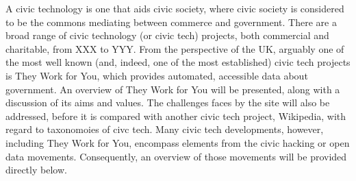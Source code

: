 A civic technology is one that aids civic society, where civic society is considered to be the commons mediating between commerce and government.
There are a broad range of civic technology (or civic tech) projects, both commercial and charitable, from XXX to YYY. 
From the perspective of the UK, arguably one of the most well known (and, indeed, one of the most established) civic tech projects is They Work for You, which provides automated, accessible data about government. 
An overview of They Work for You will be presented, along with a discussion of its aims and values. 
The challenges faces by the site will also be addressed, before it is compared with another civic tech project, Wikipedia, with regard to taxonomoies of civc tech.
Many civic tech developments, however, including They Work for You, encompass elements from the civic hacking or open data movements.
Consequently, an overview of those movements will be provided directly below.